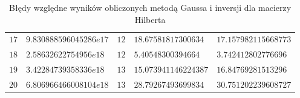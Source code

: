 \documentclass[12pt]{article}
\begin{document}
\begin{table}[h!]
\begin{tabularx}{\textwidth}{l l l l l }
                $17$ & $9.830888596045286e17$ & $12$ & $18.67581817300634$ & $17.157982115668773$ \\
                $18$ & $2.58632622754956e18$ & $12$ & $5.40548300394664$ & $3.742412802776696$ \\
                $19$ & $3.42284739358336e18$ & $13$ & $15.073941146224387$ & $16.84769281513296$ \\
                $20$ & $6.806966466008104e18$ & $13$ & $28.79267493699834$ & $30.751202239608727$ \\
                \hline
            \end{tabularx}
            \label{table:hilbert_matrix_error}
            \caption{Błędy względne wyników obliczonych metodą Gaussa i inversji dla macierzy Hilberta}
        \end{table}

        \newpage
\end{document}
